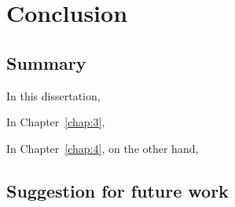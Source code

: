 
\chapter{Conclusion} \label{chap:5}
\section{Summary} \label{sec:5.1}
    In this dissertation, 
    \lipsum
    
    In Chapter~\ref{chap:3}, 
    \lipsum
    
    In Chapter~\ref{chap:4}, on the other hand, 
    \lipsum

\section{Suggestion for future work} \label{sec:5.2}
    \lipsum
    
    \lipsum

